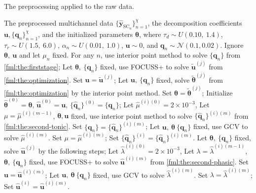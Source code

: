 \documentclass[10pt,conference]{ieeeconf}
\begin{document}
\begin{algorithm}[!tb]
  \caption{The preprocessing applied to the raw data.}
  \label{alg:deconvolution}
  \begin{algorithmic}[1]
    \REQUIRE The preprocessed multichannel data $\{\hat{\mathbf{y}}_{\mathrm{SC}_n}\}_{n=1}^\chi$, the decomposition coefficients $\mathbf{u}, \{\mathbf{q}_{n}\}_{n=1}^\chi$, and the initialized parameters $\boldsymbol{\theta}$, where $\tau_d \sim U(0.10,~1.4)$, $\tau_r \sim U(1.5,~6.0)$, $\alpha_n \sim U(0.01,~1.0)$, $\mathbf{u} \sim 0$, and $\mathbf{q}_n \sim \mathcal{N}(0.1, 0.02)$.
    \STATE Ignore $\boldsymbol{\theta},~\mathbf{u}$ and let $\mu_n$ fixed. For any $n$, use interior point method to solve $\{\mathbf{q}_{n}\}$ from \eqref{fml:the:firststage};
      \STATE Let $\boldsymbol{\theta},~\{\mathbf{q}_{n}\}$ fixed, use FOCUSS+ to solve $\tilde{\mathbf{u}}^{(j)}$ from \eqref{fml:the:optimization}. Set $\mathbf{u} = \tilde{\mathbf{u}}^{(j)}$;
      \STATE Let $\mathbf{u},~\{\mathbf{q}_{n}\}$ fixed, solve $\tilde{\boldsymbol{\theta}}^{(j)}$ from \eqref{fml:the:optimization} by the interior point method. Set $\boldsymbol{\theta} = \tilde{\boldsymbol{\theta}}^{(j)}$;
    \ENDFOR
    \STATE Initialize $\hat{\boldsymbol{\theta}}^{(0)}=\boldsymbol{\theta}$, $\hat{\mathbf{u}}^{(0)}=\mathbf{u}$, $\{\hat{\mathbf{q}}_{n}\}^{(0)}=\{\mathbf{q}_{n}\}$;
      \STATE Let $\hat{\mu}^{(i)(0)} = 2 \times 10^{-3}$,
      \STATE Let $\mu = \hat{\mu}^{(i)(m-1)}$, $\boldsymbol{\theta},\mathbf{u}$ fixed, use interior point method to solve $\{\hat{\mathbf{q}}_{n}\}^{(i)(m)}$ from \eqref{fml:the:second-tonic}. Set $\{\mathbf{q}_{n}\} = \{\hat{\mathbf{q}}_{n}\}^{(i)(m)}$;
      \STATE Let $\mathbf{u},~\boldsymbol{\theta}~\{\mathbf{q}_{n}\}$ fixed, use GCV to solve $\hat{\mu}^{(i)(m)}$. Set $\mu = \hat{\mu}^{(i)(m)}$;
      \ENDFOR
      \STATE Set $\{\hat{\mathbf{q}}_{n}\}^{(i)} =  \{\hat{\mathbf{q}}_{n}\}^{(i)(m)}$.
      \STATE Let $\boldsymbol{\theta},~\{\mathbf{q}_{n}\}$ fixed, solve $\hat{\mathbf{u}}^{(j)}$ by the following steps;
      \STATE Let $\hat{\lambda}^{(i)(0)} = 2 \times 10^{-3}$,
      \STATE Let $\lambda = \hat{\lambda}^{(i)(m-1)}$, $\boldsymbol{\theta},~\{\mathbf{q}_{n}\}$ fixed, use FOCUSS+ to solve $\hat{\mathbf{u}}^{(i)(m)}$ from \eqref{fml:the:second-phasic}. Set $\mathbf{u} = \hat{\mathbf{u}}^{(i)(m)}$;
      \STATE Let $\mathbf{u},~\boldsymbol{\theta}~\{\mathbf{q}_{n}\}$ fixed, use GCV to solve $\hat{\lambda}^{(i)(m)}$. Set $\lambda = \hat{\lambda}^{(i)(m)}$;
      \ENDFOR
      \STATE Set $\hat{\mathbf{u}}^{(i)} = \hat{\mathbf{u}}^{(i)(m)}$.
    \ENDFOR
  \end{algorithmic}
\end{algorithm}
\end{document}
